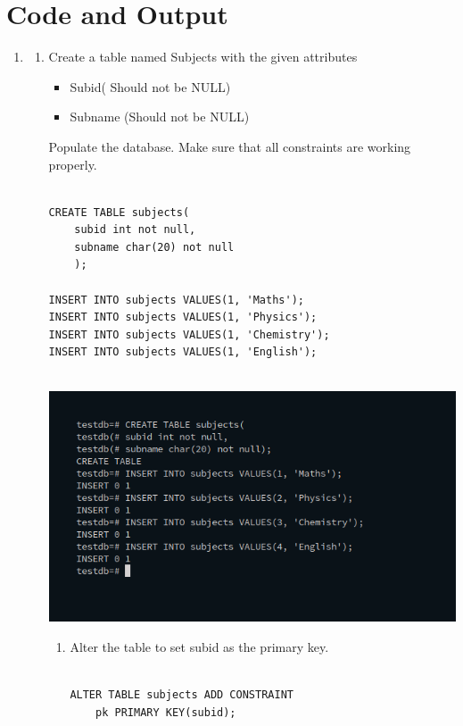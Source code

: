 \section{{Code and Output}}

\begin{enumerate}
\item
\begin{enumerate}
\item Create a table named Subjects with the given attributes
\begin{itemize}
\item Subid( Should not be NULL)
\item Subname (Should not be NULL)
\end{itemize}
Populate the database. Make sure that all constraints are working properly.\newline
\begin{verbatim}

CREATE TABLE subjects(
	subid int not null,
	subname char(20) not null
	);

INSERT INTO subjects VALUES(1, 'Maths');
INSERT INTO subjects VALUES(1, 'Physics');
INSERT INTO subjects VALUES(1, 'Chemistry');
INSERT INTO subjects VALUES(1, 'English');


\end{verbatim}
\newline
\includegraphics[width=\linewidth]{../Images/Constraints/1.png}\newline
\begin{enumerate}
\item Alter the table to set subid as the primary key.\newline
\begin{verbatim}

ALTER TABLE subjects ADD CONSTRAINT 
	pk PRIMARY KEY(subid);


\end{verbatim}
\end{enumerate}
\end{enumerate}
\end{enumerate}

